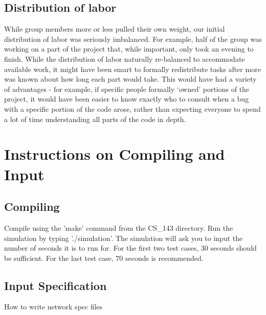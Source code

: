 \documentclass[12pt]{article}
\begin{document}
\subsection*{Distribution of labor}

While group members more or less pulled their own weight, our initial distribution of labor was seriously imbalanced. For example, half of the group was working on a part of the project that, while important, only took an evening to finish. While the distribution of labor naturally re-balanced to accommodate available work, it might have been smart to formally redistribute tasks after more was known about how long each part would take. This would have had a variety of advantages - for example, if specific people formally ‘owned’ portions of the project, it would have been easier to know exactly who to consult when a bug with a specific portion of the code arose, rather than expecting everyone to spend a lot of time understanding all parts of the code in depth.



\appendix
\section{Instructions on Compiling and Input}

\subsection{Compiling}
Compile using the 'make' command from the CS\_143 directory. Run the simulation by typing './simulation'. 
The simulation will ask you to input the number of seconds it is to run for. For the first two test cases, 30 seconds should be sufficient. For the last test case, 70 seconds is recommended.


\subsection{Input Specification}
How to write network spec files
\end{document}
